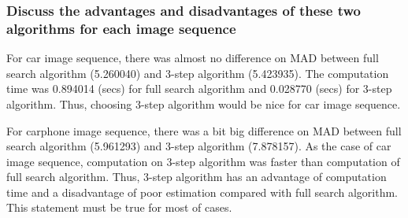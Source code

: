\documentclass[article,oneside]{memoir}
\begin{document}
\newpage

\subsubsection{Discuss the advantages and disadvantages of these two algorithms for each image sequence}

For car image sequence, there was almost no difference on MAD between full search algorithm (5.260040) and 3-step algorithm (5.423935). The computation time was 0.894014 (secs) for full search algorithm and 0.028770 (secs) for 3-step algorithm. Thus, choosing 3-step algorithm would be nice for car image sequence. 

For carphone image sequence, there was a bit big difference on MAD between full search algorithm (5.961293) and 3-step algorithm (7.878157). As the case of car image sequence, computation on 3-step algorithm was faster than computation of full search algorithm. Thus, 3-step algorithm has an advantage of computation time and a disadvantage of poor estimation compared with full search algorithm. This statement must be true for most of cases. 
\end{document}
